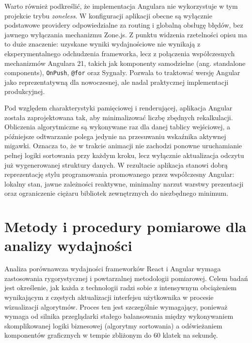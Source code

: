 \documentclass[12pt,openright,twoside]{report}
\begin{document}
Warto również podkreślić, że implementacja Angulara nie wykorzystuje w tym projekcie trybu \textit{zoneless}. W konfiguracji aplikacji obecne są wyłącznie podstawowe providery odpowiedzialne za routing i globalną obsługę błędów, bez jawnego wyłączania mechanizmu Zone.js. Z punktu widzenia rzetelności opisu ma to duże znaczenie: uzyskane wyniki wydajnościowe nie wynikają z eksperymentalnego odchudzenia frameworka, lecz z połączenia współczesnych mechanizmów Angulara 21, takich jak komponenty samodzielne (ang. standalone components), \texttt{OnPush}, \texttt{@for} oraz Sygnały. Pozwala to traktować wersję Angular jako reprezentatywną dla nowoczesnej, ale nadal praktycznej implementacji produkcyjnej.

Pod względem charakterystyki pamięciowej i renderującej, aplikacja Angular została zaprojektowana tak, aby minimalizować liczbę zbędnych rekalkulacji. Obliczenia algorytmiczne są wykonywane raz dla danej tablicy wejściowej, a późniejsze odtwarzanie polega jedynie na przesuwaniu wskaźnika aktywnej migawki. Oznacza to, że w trakcie animacji nie zachodzi ponowne uruchamianie pełnej logiki sortowania przy każdym kroku, lecz wyłącznie aktualizacja odczytu już wygenerowanej struktury danych. W rezultacie aplikacja stanowi dobrą reprezentację stylu programowania promowanego przez współczesny Angular: lokalny stan, jawne zależności reaktywne, minimalny narzut warstwy prezentacji oraz ograniczenie ciężaru bibliotek zewnętrznych do niezbędnego minimum.

\section{Metody i procedury pomiarowe dla analizy wydajności}
Analiza porównawcza wydajności frameworków React i Angular wymaga zastosowania rygorystycznej i powtarzalnej metodologii pomiarowej. Celem badań jest określenie, jak każda z technologii radzi sobie z intensywnym obciążeniem wynikającym z częstych aktualizacji interfejsu użytkownika w procesie wizualizacji algorytmów. Proces ten jest szczególnie wymagający, ponieważ wymaga od silnika przeglądarki stałego balansowania między wykonywaniem skomplikowanej logiki biznesowej (algorytmy sortowania) a odświeżaniem komponentów graficznych w tempie zbliżonym do 60 klatek na sekundę.
\end{document}
